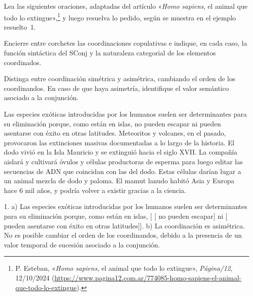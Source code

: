 \begin{ejercicio}\label{ej:12-copulativas}
Lea las siguientes oraciones, adaptadas del artículo «\textit{Homo sapiens}, el
animal que todo lo extingue»,\footnote{P. Esteban, «\textit{Homo sapiens}, el
animal que todo lo extingue», \textit{Página/12}, 12/10/2024
(\url{https://www.pagina12.com.ar/774085-homo-sapiens-el-animal-que-todo-lo-extingue}).}
y luego resuelva lo pedido, según se muestra en el ejemplo resuelto~1.

\begin{consignas}
  \item Encierre entre corchetes las coordinaciones copulativas e indique, en cada
        caso, la función sintáctica del SConj y la naturaleza categorial de los
        elementos coordinados.
  \item Distinga entre coordinación simétrica y asimétrica, cambiando el orden de
        los coordinandos. En caso de que haya asimetría, identifique el valor
        semántico asociado a la conjunción.
\end{consignas}

\begin{exe}
  \ex Las especies exóticas introducidas por los humanos suelen ser
      determinantes para su eliminación porque, como están en islas, no pueden
      escapar ni pueden asentarse con éxito en otras latitudes.
  \ex Meteoritos y volcanes, en el pasado, provocaron las extinciones masivas
      documentadas a lo largo de la historia.
  \ex El dodo vivió en la Isla Mauricio y se extinguió hacia el siglo XVII.
  \ex La compañía aislará y cultivará óvulos y células productoras de esperma
      para luego editar las secuencias de ADN que coincidan con las del dodo.
  \ex Estas células darían lugar a un animal mezcla de dodo y paloma.
  \ex El mamut lanudo habitó Asia y Europa hace 6 mil años, y podría volver a
      existir gracias a la ciencia.
\end{exe}

\begin{resuelto}
1. a) Las especies exóticas introducidas por los humanos suelen ser
determinantes para su eliminación porque, como están en islas,
[ [ no pueden escapar] ni
[ pueden asentarse con éxito en otras latitudes]]. b) La
coordinación es asimétrica. No es posible cambiar el orden de los coordinandos,
debido a la presencia de un valor temporal de sucesión asociado a la
conjunción.
\end{resuelto}
\end{ejercicio}

